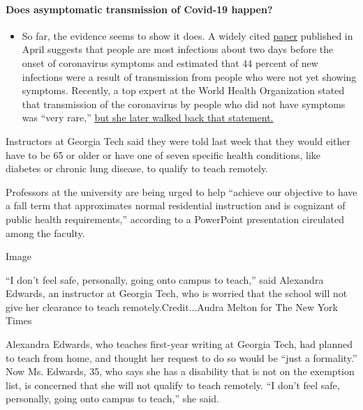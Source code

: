 \begin{itemize}
{  \paragraph{Does asymptomatic transmission of Covid-19
  happen?}\label{does-asymptomatic-transmission-of-covid-19-happen}}

  \begin{itemize}
  \tightlist
  \item
    So far, the evidence seems to show it does. A widely cited
    \href{https://www.nature.com/articles/s41591-020-0869-5}{paper}
    published in April suggests that people are most infectious about
    two days before the onset of coronavirus symptoms and estimated that
    44 percent of new infections were a result of transmission from
    people who were not yet showing symptoms. Recently, a top expert at
    the World Health Organization stated that transmission of the
    coronavirus by people who did not have symptoms was ``very rare,''
    \href{https://www.nytimes.com/2020/06/09/world/coronavirus-updates.html?action=click\&pgtype=Article\&state=default\&region=MAIN_CONTENT_3\&context=storylines_faq\#link-1f302e21}{but
    she later walked back that statement.}
  \end{itemize}
\end{itemize}

Instructors at Georgia Tech said they were told last week that they
would either have to be 65 or older or have one of seven specific health
conditions, like diabetes or chronic lung disease, to qualify to teach
remotely.

Professors at the university are being urged to help ``achieve our
objective to have a fall term that approximates normal residential
instruction and is cognizant of public health requirements,'' according
to a PowerPoint presentation circulated among the faculty.

Image

``I don't feel safe, personally, going onto campus to teach,'' said
Alexandra Edwards, an instructor at Georgia Tech, who is worried that
the school will not give her clearance to teach remotely.Credit...Audra
Melton for The New York Times

Alexandra Edwards, who teaches first-year writing at Georgia Tech, had
planned to teach from home, and thought her request to do so would be
``just a formality.'' Now Ms. Edwards, 35, who says she has a disability
that is not on the exemption list, is concerned that she will not
qualify to teach remotely. ``I don't feel safe, personally, going onto
campus to teach,'' she said.


